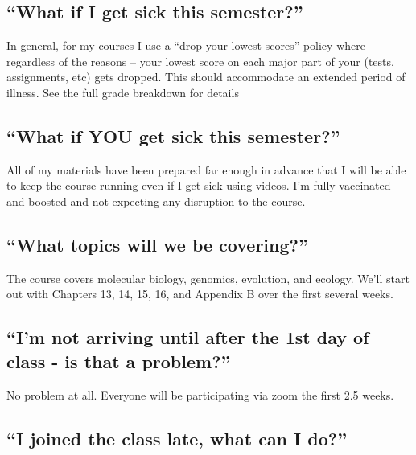 \documentclass[
]{book}
\begin{document}
\hypertarget{what-if-i-get-sick-this-semester}{%
\subsection{``What if I get sick this semester?''}\label{what-if-i-get-sick-this-semester}}

In general, for my courses I use a ``drop your lowest scores'' policy where -- regardless of the reasons -- your lowest score on each major part of your (tests, assignments, etc) gets dropped. This should accommodate an extended period of illness. See the full grade breakdown for details

\hypertarget{what-if-you-get-sick-this-semester}{%
\subsection{``What if YOU get sick this semester?''}\label{what-if-you-get-sick-this-semester}}

All of my materials have been prepared far enough in advance that I will be able to keep the course running even if I get sick using videos. I'm fully vaccinated and boosted and not expecting any disruption to the course.

\hypertarget{what-topics-will-we-be-covering}{%
\subsection{``What topics will we be covering?''}\label{what-topics-will-we-be-covering}}

The course covers molecular biology, genomics, evolution, and ecology. We'll start out with Chapters 13, 14, 15, 16, and Appendix B over the first several weeks.

\hypertarget{im-not-arriving-until-after-the-1st-day-of-class---is-that-a-problem}{%
\subsection{``I'm not arriving until after the 1st day of class - is that a problem?''}\label{im-not-arriving-until-after-the-1st-day-of-class---is-that-a-problem}}

No problem at all. Everyone will be participating via zoom the first 2.5 weeks.

\hypertarget{i-joined-the-class-late-what-can-i-do}{%
\subsection{``I joined the class late, what can I do?''}\label{i-joined-the-class-late-what-can-i-do}}
\end{document}
